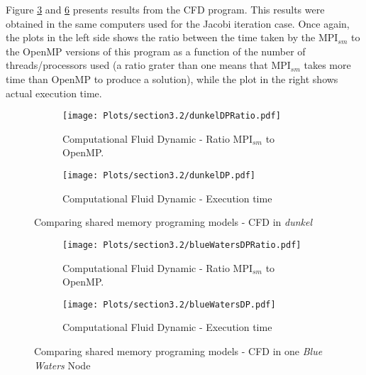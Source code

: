 \medskip

Figure \ref{fig:Figure3} and \ref{fig:Figure4} presents results from the CFD program. This results were obtained in the same computers used for the Jacobi iteration case. Once again, the plots in the left side shows the ratio between the time taken by the MPI$_{sm}$ to the OpenMP versions of this program as a function of the number of threads/processors used (a ratio grater than one means that MPI$_{sm}$ takes more time than OpenMP to produce a solution), while the plot in the right shows actual execution time.



\begin{figure} [h!]
    \centering
    \captionsetup{justification=raggedright, singlelinecheck=false}
    \begin{subfigure}{.6\textwidth}
      \hspace*{-1.5cm} 
      \texttt{[image: Plots/section3.2/dunkelDPRatio.pdf]}
      \caption{Computational Fluid Dynamic - Ratio MPI$_{sm}$ to OpenMP.}
      \label{fig:RatioDunkelCFD}
    \end{subfigure}%
    \begin{subfigure}{.6\textwidth}
      \hspace*{-1.5cm} 
      \texttt{[image: Plots/section3.2/dunkelDP.pdf]}
      \caption{Computational Fluid Dynamic - Execution time}
      \label{fig:TimeDunkelCFD}
    \end{subfigure}
\caption{Comparing shared memory programing models - CFD in \emph{dunkel}}
\label{fig:Figure3}
\end{figure}

\medskip


\begin{figure} [h!]
    \centering
    \captionsetup{justification=raggedright, singlelinecheck=false}
    \begin{subfigure}{.6\textwidth}
      \hspace*{-1.5cm} 
      \texttt{[image: Plots/section3.2/blueWatersDPRatio.pdf]}
      \caption{Computational Fluid Dynamic - Ratio MPI$_{sm}$ to OpenMP.}
      \label{fig:RatioBWCFD}
    \end{subfigure}%
    \begin{subfigure}{.6\textwidth}
      \hspace*{-1.5cm} 
      \texttt{[image: Plots/section3.2/blueWatersDP.pdf]}
      \caption{Computational Fluid Dynamic - Execution time}
      \label{fig:TimeBWCFD}
    \end{subfigure}
\caption{Comparing shared memory programing models - CFD in one \emph{Blue Waters} Node}
\label{fig:Figure4}
\end{figure}



